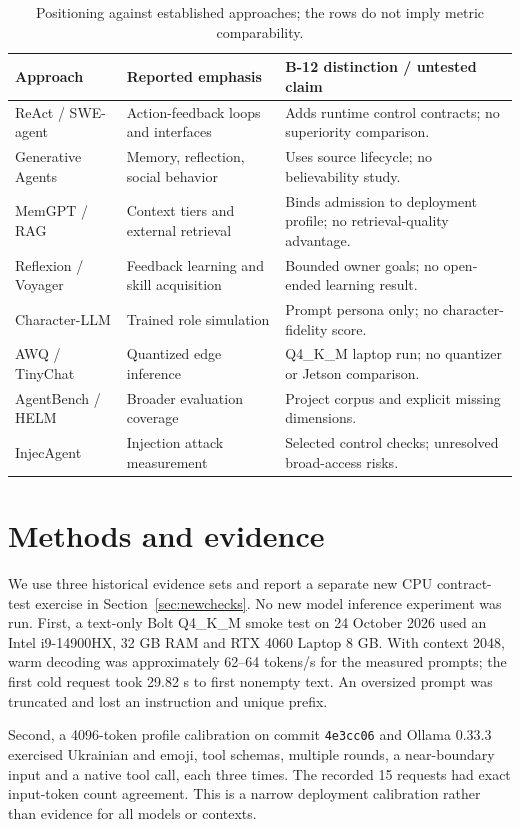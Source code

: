 \documentclass[11pt,a4paper]{article}
\begin{document}
\begin{table}[tbp]
\caption{Positioning against established approaches; the rows do not imply metric comparability.}\label{tab:related}
\centering
\small
\begin{tabularx}{\linewidth}{P{.18\linewidth}YY}\toprule
Approach & Reported emphasis & B-12 distinction / untested claim\\\midrule
ReAct / SWE-agent & Action-feedback loops and interfaces & Adds runtime control contracts; no superiority comparison.\\
Generative Agents & Memory, reflection, social behavior & Uses source lifecycle; no believability study.\\
MemGPT / RAG & Context tiers and external retrieval & Binds admission to deployment profile; no retrieval-quality advantage.\\
Reflexion / Voyager & Feedback learning and skill acquisition & Bounded owner goals; no open-ended learning result.\\
Character-LLM & Trained role simulation & Prompt persona only; no character-fidelity score.\\
AWQ / TinyChat & Quantized edge inference & Q4\_K\_M laptop run; no quantizer or Jetson comparison.\\
AgentBench / HELM & Broader evaluation coverage & Project corpus and explicit missing dimensions.\\
InjecAgent & Injection attack measurement & Selected control checks; unresolved broad-access risks.\\\bottomrule
\end{tabularx}
\end{table}

\section{Methods and evidence}
We use three historical evidence sets and report a separate new CPU contract-test exercise in Section~\ref{sec:newchecks}. No new model inference experiment was run. First, a text-only Bolt Q4\_K\_M smoke test on 24 October 2026 used an Intel i9-14900HX, 32 GB RAM and RTX 4060 Laptop 8 GB. With context 2048, warm decoding was approximately 62--64 tokens/s for the measured prompts; the first cold request took 29.82 s to first nonempty text. An oversized prompt was truncated and lost an instruction and unique prefix.

Second, a 4096-token profile calibration on commit \texttt{4e3cc06} and Ollama 0.33.3 exercised Ukrainian and emoji, tool schemas, multiple rounds, a near-boundary input and a native tool call, each three times. The recorded 15 requests had exact input-token count agreement. This is a narrow deployment calibration rather than evidence for all models or contexts.
\end{document}
